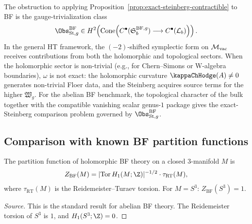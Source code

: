 \begin{remark}
The obstruction to applying Proposition~\ref{prop:exact-steinberg-contractible}
to BF is the gauge-trivialization class
\[
\Obs^{\mathrm{BF}}_{\mathrm{St},g}\in
H^2\!\left(\Cone\!\left(C^\bullet(\Steinberg_b^{\mathrm{BF},g})
\longrightarrow C^\bullet(\mathcal L_b)\right)\right).
\]
In the general HT framework, the
$(-2)$-shifted symplectic form on $\mathcal{M}_{\mathrm{vac}}$ receives contributions from
both the holomorphic and topological sectors. When the holomorphic
sector is non-trivial (e.g., for Chern--Simons or W-algebra
boundaries), $\omega$ is not exact: the holomorphic curvature
$\kappaChHodge(A) \neq 0$ generates non-trivial Floer data, and the
Steinberg acquires source terms for the higher $\mathfrak{W}_g$.
For the abelian BF benchmark, the topological character of the bulk
together with the compatible vanishing scalar genus-$1$ package gives
the exact-Steinberg comparison problem governed by
$\Obs^{\mathrm{BF}}_{\mathrm{St},g}$.
\end{remark}

\subsection{Comparison with known BF partition functions}

\begin{proposition}
\label{prop:cs-bf-partition}
The partition function of holomorphic BF theory on a closed $3$-manifold $M$ is
\begin{equation}
Z_{\mathrm{BF}}(M) = |\mathrm{Tor}\, H_1(M; \Z)|^{-1/2} \cdot
\tau_{\mathrm{RT}}(M),
\end{equation}
where $\tau_{\mathrm{RT}}(M)$ is the Reidemeister--Turaev torsion. For $M = S^3$:
$Z_{\mathrm{BF}}(S^3) = 1$.
\end{proposition}

\begin{proof}[Source]
This is the standard result for abelian BF theory. The Reidemeister torsion of $S^3$
is $1$, and $H_1(S^3; \Z) = 0$.
\end{proof}

